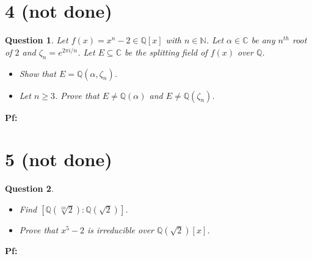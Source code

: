 \documentclass{article}
\newtheorem{question}{Question}
\begin{document}
\break

\section*{4 (not done)}
\begin{myBox}[]{}
    \begin{question}
        Let $f(x)=x^n-2\in\mathbb{Q}[x]$ with $n\in\mathbb{N}$. Let $\alpha\in\mathbb{C}$ be any $n^{th}$ root of $2$ and $\zeta_n=e^{2\pi i/n}$.
        Let $E\subseteq\mathbb{C}$ be the splitting field of $f(x)$ over $\mathbb{Q}$.
        \begin{itemize}
            \item[(a)] Show that $E=\mathbb{Q}(\alpha,\zeta_n)$.
            \item[(b)] Let $n\geq 3$. Prove that $E\neq\mathbb{Q}(\alpha)$ and $E\neq\mathbb{Q}(\zeta_n)$. 
        \end{itemize}
    \end{question}
\end{myBox}

\textbf{Pf:}

\break

\section*{5 (not done)}
\begin{myBox}[]{}
    \begin{question}

        \hfil

        \begin{itemize}
            \item[(a)] Find $[\mathbb{Q}(\sqrt[10]{2}):\mathbb{Q}(\sqrt{2})]$.
            \item[(b)] Prove that $x^5-2$ is irreducible over $\mathbb{Q}(\sqrt{2})[x]$. 
        \end{itemize}
    \end{question}
\end{myBox}

\textbf{Pf:}
\end{document}
